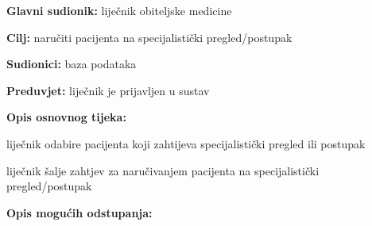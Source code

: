                    \noindent {}
					\begin{packed_item}
	
						\item \textbf{Glavni sudionik: }liječnik obiteljske medicine
						\item  \textbf{Cilj:} naručiti pacijenta na specijalistički pregled/postupak
						\item  \textbf{Sudionici:} baza podataka
						\item  \textbf{Preduvjet:} liječnik je prijavljen u sustav
						\item  \textbf{Opis osnovnog tijeka:}
						
						\item[] \begin{packed_enum}
	
							\item liječnik odabire pacijenta koji zahtijeva specijalistički pregled ili postupak
							\item liječnik šalje zahtjev za naručivanjem pacijenta na specijalistički pregled/postupak
							\item 

						\end{packed_enum}
						
						\item  \textbf{Opis mogućih odstupanja:}
						
						\item[] \begin{packed_item}
	
							\item[2.a] 
							\item[] \begin{packed_enum}
								
								\item 
								\item 
							\end{packed_enum}
							
						\end{packed_item}
					\end{packed_item}

